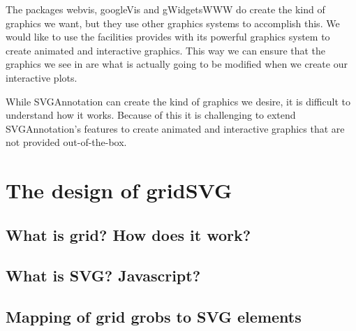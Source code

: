 The packages \textsf{webvis}, \textsf{googleVis} and \textsf{gWidgetsWWW} do create the kind of graphics we want, but they use other graphics systems to accomplish this.
We would like to use the facilities \R{} provides with its powerful graphics system to create animated and interactive graphics.
This way we can ensure that the graphics we see in \R{} are what is actually going to be modified when we create our interactive plots.

While \textsf{SVGAnnotation} can create the kind of graphics we desire, it is difficult to understand how it works.
Because of this it is challenging to extend \textsf{SVGAnnotation}'s features to create animated and interactive graphics that are not provided out-of-the-box.

\chapter{The design of gridSVG}

\section{What is grid? How does it work?}

\begin{center}
\end{center}

\section{What is SVG? Javascript?}

\section{Mapping of grid grobs to SVG elements}

